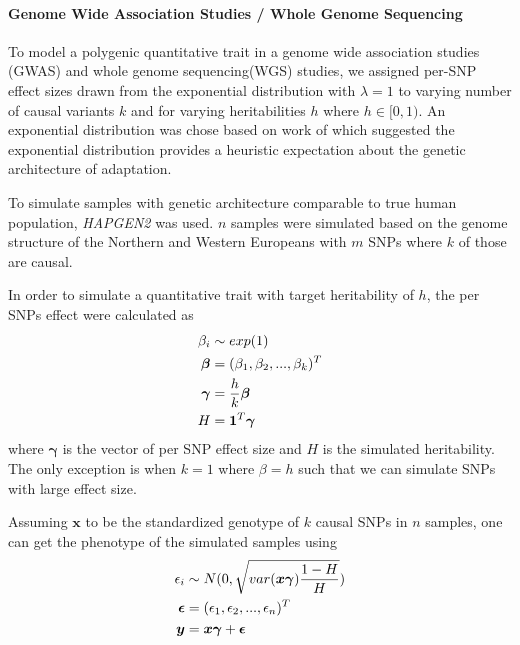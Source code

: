 \paragraph{Genome Wide Association Studies / Whole Genome Sequencing}
To model a polygenic quantitative trait in a genome wide association studies (GWAS) and whole genome sequencing(WGS) studies, we assigned per-SNP effect sizes drawn from the exponential distribution with $\lambda = 1$ to varying number of causal variants $k$ and for varying heritabilities $h$ where $h\in[0,1)$. 
An exponential distribution was chose based on work of \citet{Orr1998} which suggested the exponential distribution provides a heuristic expectation about the genetic architecture of adaptation.

To simulate samples with genetic architecture comparable to true human population, \textit{HAPGEN2}\cite{Su2011} was used.
$n$ samples were simulated based on the genome structure of the Northern and Western Europeans with $m$ SNPs where $k$ of those are causal.

In order to simulate a quantitative trait with target heritability of $h$, the per SNPs effect were calculated as
\begin{align}
\beta_i &\sim exp(1)\notag\\
\boldsymbol{\beta}&=(\beta_1,\beta_2,...,\beta_k)^T\notag\\
\boldsymbol{\gamma} &= \frac{h}{k}\boldsymbol{\beta}\notag\\
H&=\boldsymbol{1}^T\boldsymbol{\gamma}
\label{eq:perSnpEffect}
\end{align}
where $\boldsymbol{\gamma}$ is the vector of per SNP effect size and $H$ is the simulated heritability.
The only exception is when $k=1$ where $\beta = h$ such that we can simulate SNPs with large effect size.

Assuming $\boldsymbol{x}$ to be the standardized genotype of $k$ causal SNPs in $n$ samples, one can get the phenotype of the simulated samples using
\begin{align}
\epsilon_i&\sim N(0,\sqrt{var(\boldsymbol{x\gamma})\frac{1-H}{H}} )\notag\\
\boldsymbol{\epsilon} &= (\epsilon_1,\epsilon_2,...,\epsilon_n)^T\notag\\
\boldsymbol{y} &= \boldsymbol{x\gamma}+\boldsymbol{\epsilon}
\label{eq:phenotypeSimulation}
\end{align}

